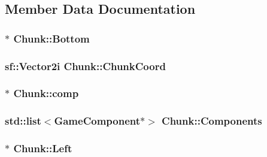 \subsection{Member Data Documentation}
\hypertarget{class_chunk_ac9ac53a727ae045b6f751ec6a68bcaca}{
\subsubsection[{Bottom}]{$\ast$ Chunk\-::\-Bottom\hspace{0.3cm}{\ttfamily [private]}}}\label{class_chunk_ac9ac53a727ae045b6f751ec6a68bcaca}
\hypertarget{class_chunk_abb5b1842148b3d7c616065766bfd2b33}{
\subsubsection[{Chunk\-Coord}]{\setlength{\rightskip}{0pt plus 5cm}sf\-::\-Vector2i Chunk\-::\-Chunk\-Coord\hspace{0.3cm}{\ttfamily [private]}}}\label{class_chunk_abb5b1842148b3d7c616065766bfd2b33}
\hypertarget{class_chunk_a633545d862acb016a7081c364126c7b8}{
\subsubsection[{comp}]{ $\ast$ Chunk\-::comp}}\label{class_chunk_a633545d862acb016a7081c364126c7b8}
\hypertarget{class_chunk_a4cdf6febd96ff99b681e37d548617a38}{
\subsubsection[{Components}]{\setlength{\rightskip}{0pt plus 5cm}std\-::list$<${\bf Game\-Component}$\ast$$>$ Chunk\-::\-Components\hspace{0.3cm}{\ttfamily [private]}}}\label{class_chunk_a4cdf6febd96ff99b681e37d548617a38}
\hypertarget{class_chunk_aee27c2584364a58dc8811e9ada0695dd}{
\subsubsection[{Left}]{$\ast$ Chunk\-::\-Left\hspace{0.3cm}{\ttfamily [private]}}}\label{class_chunk_aee27c2584364a58dc8811e9ada0695dd}
